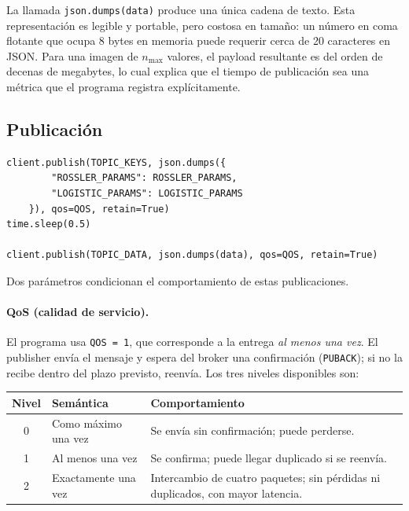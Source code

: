 \documentclass[12pt,a4paper]{article}
\begin{document}
La llamada \texttt{json.dumps(data)} produce una única cadena de texto. Esta representación es legible y portable, pero costosa en tamaño: un número en coma flotante que ocupa 8 bytes en memoria puede requerir cerca de 20 caracteres en JSON. Para una imagen de $n_{\max}$ valores, el payload resultante es del orden de decenas de megabytes, lo cual explica que el tiempo de publicación sea una métrica que el programa registra explícitamente.

\subsection{Publicación}

\begin{lstlisting}[caption={Publicación de parámetros y datos}]
client.publish(TOPIC_KEYS, json.dumps({
        "ROSSLER_PARAMS": ROSSLER_PARAMS,
        "LOGISTIC_PARAMS": LOGISTIC_PARAMS
    }), qos=QOS, retain=True)
time.sleep(0.5)

client.publish(TOPIC_DATA, json.dumps(data), qos=QOS, retain=True)
\end{lstlisting}

Dos parámetros condicionan el comportamiento de estas publicaciones.

\paragraph{QoS (calidad de servicio).} El programa usa \texttt{QOS = 1}, que corresponde a la entrega \textit{al menos una vez}. El publisher envía el mensaje y espera del broker una confirmación (\texttt{PUBACK}); si no la recibe dentro del plazo previsto, reenvía. Los tres niveles disponibles son:

\begin{center}
\begin{tabularx}{0.95\textwidth}{@{}c l X@{}}
\toprule
\textbf{Nivel} & \textbf{Semántica} & \textbf{Comportamiento} \\
\midrule
0 & Como máximo una vez & Se envía sin confirmación; puede perderse. \\
1 & Al menos una vez & Se confirma; puede llegar duplicado si se reenvía. \\
2 & Exactamente una vez & Intercambio de cuatro paquetes; sin pérdidas ni duplicados, con mayor latencia. \\
\bottomrule
\end{tabularx}
\end{center}
\end{document}
